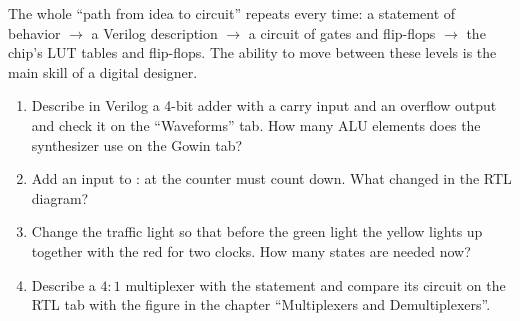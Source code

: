\begin{ideabox}
The whole ``path from idea to circuit'' repeats every time:
a statement of behavior $\to$ a Verilog description $\to$ a circuit of gates and
flip-flops $\to$ the chip's LUT tables and flip-flops. The ability to move between
these levels is the main skill of a digital designer.
\end{ideabox}

\begin{taskbox}[Tasks]
\begin{enumerate}
  \item Describe in Verilog a 4-bit adder with a carry input and an overflow output
        and check it on the ``Waveforms'' tab. How many ALU elements
        does the synthesizer use on the Gowin tab?
  \item Add an input  to : at  the counter must
        count down. What changed in the RTL diagram?
  \item Change the traffic light so that before the green light the yellow
        lights up together with the red for two clocks. How many states are needed now?
  \item Describe a $4:1$ multiplexer with the statement  and
        compare its circuit on the RTL tab with the figure in the chapter ``Multiplexers and Demultiplexers''.
\end{enumerate}
\end{taskbox}
